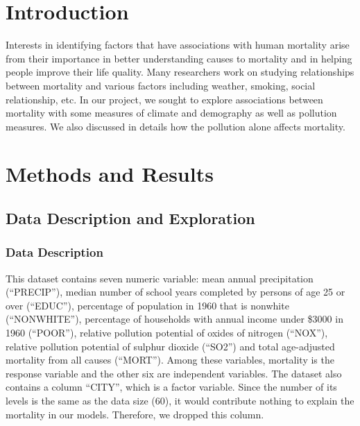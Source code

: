 \documentclass{article}
\newcommand\blankpage{%
    \null
    \thispagestyle{empty}%
    \addtocounter{page}{-1}%
    \newpage}
\begin{document}
\afterpage{\blankpage}



\setcounter{page}{1}

\section{Introduction}
   Interests in identifying factors that have associations with human mortality arise from their importance in better understanding causes to mortality and in helping people improve their life quality. Many researchers work on studying relationships between mortality and various factors including weather, smoking, social relationship, etc.
   In our project, we sought to explore associations between mortality with some measures of climate and demography as well as pollution measures. We also discussed in details how the pollution alone affects mortality.

\section{Methods and Results}

  \subsection{Data Description and Exploration}

    \subsubsection{Data Description}

       This dataset contains seven numeric variable: mean annual precipitation (“PRECIP”), median number of school years completed by persons of age 25 or over (“EDUC”), percentage of population in 1960 that is nonwhite (“NONWHITE”), percentage of households with annual income under \$3000 in 1960 (“POOR”), relative pollution potential of oxides of nitrogen (“NOX”), relative pollution potential of sulphur dioxide (“SO2”) and total age-adjusted mortality from all causes (“MORT”). Among these variables, mortality is the response variable and the other six are independent variables. The dataset also contains a column “CITY”, which is a factor variable. Since the number of its levels is the same as the data size (60), it would contribute nothing to explain the mortality in our models. Therefore, we dropped this column.
\end{document}
